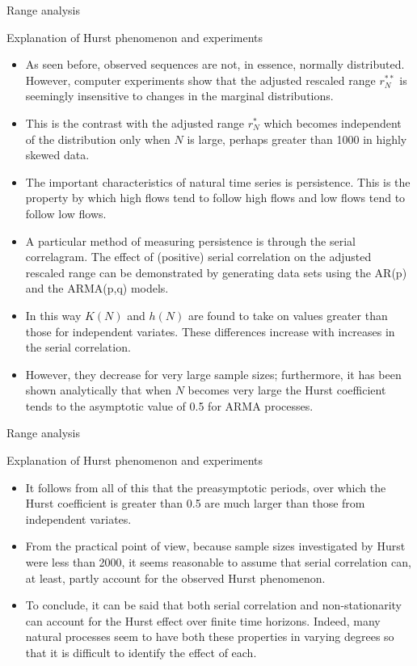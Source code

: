 \documentclass[8pt]{beamer}
\renewcommand{\emph}[1]{\textcolor{myorange}{#1}}
\begin{document}
\begin{frame}{Range analysis}
    \begin{block}{Explanation of Hurst phenomenon and experiments}
    \end{block}
    \begin{itemize}
        \item As seen before, observed sequences are not, in essence, normally distributed. However, computer experiments show that the \emph{adjusted rescaled range} $r_N^{**}$ is seemingly insensitive to changes in the marginal distributions.
        \item This is the contrast with the \emph{adjusted range} $r_N^*$ which becomes independent of the distribution only when $N$ is large, perhaps greater than 1000 in highly  skewed data. 
        \item The important characteristics of natural time series is \emph{persistence}. This is the property by which high flows tend to follow high flows and low flows tend to follow low flows. 
        \item A particular method of measuring persistence is through the \emph{serial correlagram}. The effect of (positive) serial correlation on the \emph{adjusted rescaled range} can be demonstrated by generating data sets using the \emph{AR(p)} and the \emph{ARMA(p,q)} models.
        \item In this way $K(N)$ and $h(N)$ are found to take on values greater than those for independent variates. These differences increase with increases in the \emph{serial correlation}. 
        \item However, they decrease for very large sample sizes; furthermore, it has been shown analytically that when $N$ becomes very large the \emph{Hurst coefficient} tends to the asymptotic value of 0.5 for \emph{ARMA} processes. 
    \end{itemize}
\end{frame}

\begin{frame}{Range analysis}
    \begin{block}{Explanation of Hurst phenomenon and experiments}
    \end{block}
    \begin{itemize}
        \item It follows from all of this that the preasymptotic  periods, over which the \emph{Hurst coefficient} is greater than 0.5 are much larger than those from independent variates.
        \item From the practical point of view, because sample sizes investigated by \emph{Hurst} were less than 2000, it seems reasonable to assume that \emph{serial correlation} can, at least, partly account for the observed \emph{Hurst phenomenon}.
        \item To conclude, it can be said that both \emph{serial correlation} and \emph{non-stationarity} can account for the \emph{Hurst} effect over finite time horizons. Indeed, many natural processes seem to have both these properties in varying degrees so that it is difficult to identify the effect of each. 
    \end{itemize}
\end{frame}
\end{document}

